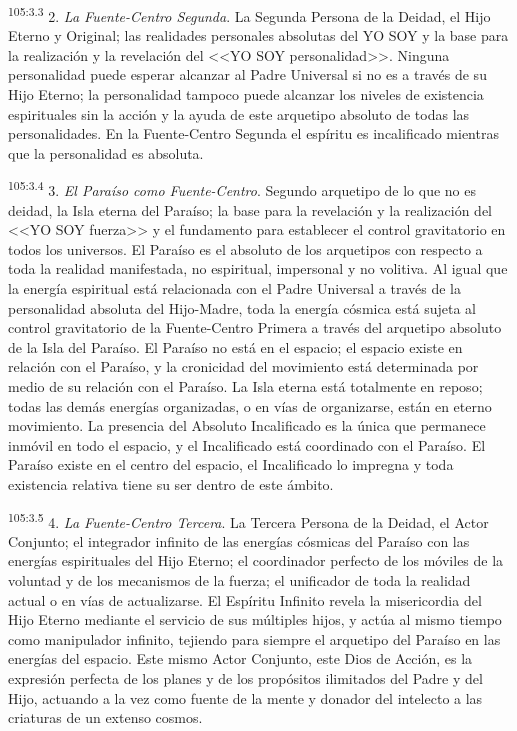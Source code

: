 \par
\textsuperscript{105:3.3} 2. \textit{La Fuente-Centro Segunda}. La Segunda Persona de la Deidad, el Hijo Eterno y Original; las realidades personales absolutas del YO SOY y la base para la realización y la revelación del <<YO SOY personalidad>>. Ninguna personalidad puede esperar alcanzar al Padre Universal si no es a través de su Hijo Eterno; la personalidad tampoco puede alcanzar los niveles de existencia espirituales sin la acción y la ayuda de este arquetipo absoluto de todas las personalidades. En la Fuente-Centro Segunda el espíritu es incalificado mientras que la personalidad es absoluta.

\par
\textsuperscript{105:3.4} 3. \textit{El Paraíso como Fuente-Centro}. Segundo arquetipo de lo que no es deidad, la Isla eterna del Paraíso; la base para la revelación y la realización del <<YO SOY fuerza>> y el fundamento para establecer el control gravitatorio en todos los universos. El Paraíso es el absoluto de los arquetipos con respecto a toda la realidad manifestada, no espiritual, impersonal y no volitiva. Al igual que la energía espiritual está relacionada con el Padre Universal a través de la personalidad absoluta del Hijo-Madre, toda la energía cósmica está sujeta al control gravitatorio de la Fuente-Centro Primera a través del arquetipo absoluto de la Isla del Paraíso. El Paraíso no está en el espacio; el espacio existe en relación con el Paraíso, y la cronicidad del movimiento está determinada por medio de su relación con el Paraíso. La Isla eterna está totalmente en reposo; todas las demás energías organizadas, o en vías de organizarse, están en eterno movimiento. La presencia del Absoluto Incalificado es la única que permanece inmóvil en todo el espacio, y el Incalificado está coordinado con el Paraíso. El Paraíso existe en el centro del espacio, el Incalificado lo impregna y toda existencia relativa tiene su ser dentro de este ámbito.

\par
\textsuperscript{105:3.5} 4. \textit{La Fuente-Centro Tercera}. La Tercera Persona de la Deidad, el Actor Conjunto; el integrador infinito de las energías cósmicas del Paraíso con las energías espirituales del Hijo Eterno; el coordinador perfecto de los móviles de la voluntad y de los mecanismos de la fuerza; el unificador de toda la realidad actual o en vías de actualizarse. El Espíritu Infinito revela la misericordia del Hijo Eterno mediante el servicio de sus múltiples hijos, y actúa al mismo tiempo como manipulador infinito, tejiendo para siempre el arquetipo del Paraíso en las energías del espacio. Este mismo Actor Conjunto, este Dios de Acción, es la expresión perfecta de los planes y de los propósitos ilimitados del Padre y del Hijo, actuando a la vez como fuente de la mente y donador del intelecto a las criaturas de un extenso cosmos.

